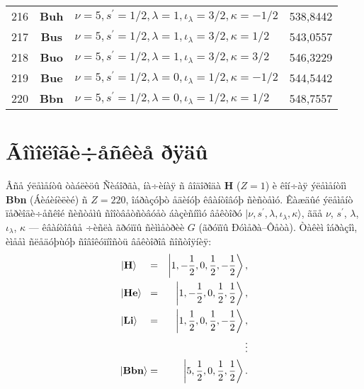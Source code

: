 \begin{center}
{\begin{tabular}{|c|c|l|c|}
216 & \textbf{Buh}& $\nu=5,s^\prime=1/2,\lambda=1,\iota_\lambda=3/2,\kappa=-1/2$ &  538,8442\\
217 & \textbf{Bus}& $\nu=5,s^\prime=1/2,\lambda=1,\iota_\lambda=3/2,\kappa=1/2$ &  543,0557\\
218 & \textbf{Buo}& $\nu=5,s^\prime=1/2,\lambda=1,\iota_\lambda=3/2,\kappa=3/2$ &  546,3229\\
\hline
219 & \textbf{Bue}& $\nu=5,s^\prime=1/2,\lambda=0,\iota_\lambda=1/2,\kappa=-1/2$ &  544,5442\\
220 & \textbf{Bbn}& $\nu=5,s^\prime=1/2,\lambda=0,\iota_\lambda=1/2,\kappa=1/2$ &  548,7557\\
\hline
\end{tabular}
}
\end{center}
\section{Ãîìîëîãè÷åñêèå ðÿäû}
Âñå ýëåìåíòû òàáëèöû Ñèáîðãà, íà÷èíàÿ ñ âîäîðîäà \textbf{H} ($Z=1$) è êîí÷àÿ ýëåìåíòîì \textbf{Bbn} (Áèáèíèëèé) ñ $Z=220$, îáðàçóþò åäèíóþ êâàíòîâóþ ñèñòåìó. Êàæäûé ýëåìåíò ïåðèîäè÷åñêîé ñèñòåìû ñîîòâåòñòâóåò áàçèñíîìó âåêòîðó $|\nu,s^\prime,\lambda,\iota_\lambda,\kappa\rangle$, ãäå $\nu$, $s^\prime$, $\lambda$, $\iota_\lambda$, $\kappa$ --- êâàíòîâûå ÷èñëà ãðóïïû ñèììåòðèè $G$ (ãðóïïû Ðóìåðà--Ôåòà). Òàêèì îáðàçîì, èìååì ñëåäóþùóþ ñîâîêóïíîñòü âåêòîðîâ ñîñòîÿíèÿ:
\begin{eqnarray}
|\textbf{H}\rangle\phantom{bn}\hspace{0.25mm}&=&\left|1,-\frac{1}{2},0,\frac{1}{2},-\frac{1}{2}\right\rangle,\nonumber\\
|\textbf{He}\rangle\phantom{n}&=&\left|1,-\frac{1}{2},0,\frac{1}{2},\frac{1}{2}\right\rangle,\nonumber\\
|\textbf{Li}\rangle\phantom{bn}&=&\left|1,\frac{1}{2},0,\frac{1}{2},-\frac{1}{2}\right\rangle,\label{System}\\
&&\vdots\nonumber\\
|\textbf{Bbn}\rangle&=&\left|5,\frac{1}{2},0,\frac{1}{2},\frac{1}{2}\right\rangle.\nonumber
\end{eqnarray}
